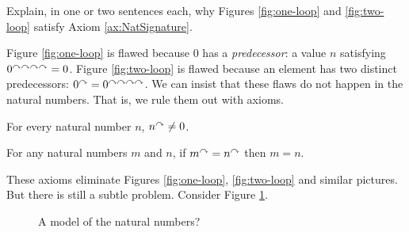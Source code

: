 \begin{exercises}
\item
Explain, in one or two sentences each, why Figures \ref{fig:one-loop} and \ref{fig:two-loop} satisfy Axiom \ref{ax:NatSignature}.
\end{exercises}
\ipadbreak

Figure \ref{fig:one-loop} is flawed because $0$ has a
\emph{predecessor}: a value $n$ satisfying $0^{\curvearrowright\curvearrowright\curvearrowright\curvearrowright} = 0$. Figure
\ref{fig:two-loop} is flawed because an element has two distinct
predecessors: $0^\curvearrowright = 0^{\curvearrowright\curvearrowright\curvearrowright\curvearrowright}$.  We can insist that
these flaws do not happen in the natural numbers. That is, 
we rule them out with axioms.

\begin{axiom}\label{ax:NatZero}
  For every natural number $n$, $n^\curvearrowright\neq 0$.
\end{axiom}

\begin{axiom}\label{ax:NatPred}
  For any natural numbers $m$ and $n$, if $m^\curvearrowright=n^\curvearrowright$ then $m=n$.
\end{axiom}

These axioms eliminate Figures \ref{fig:one-loop}, \ref{fig:two-loop} and similar pictures.  
But there is still a subtle problem. 
Consider Figure \ref{fig:nonstandard}.

\begin{figure}[h]
  \centering
  \caption{A model of the natural numbers?}
  \label{fig:nonstandard}
\end{figure}

